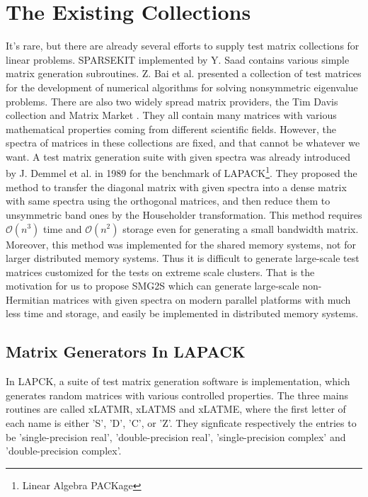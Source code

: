 \section{The Existing Collections} \label{Existing Collections}

It's rare, but there are already several efforts to supply test matrix collections for linear problems. SPARSEKIT \cite{saad1994sparsekit} implemented by Y. Saad contains various simple matrix generation subroutines. Z. Bai et al. \cite{bai1996test} presented a collection of test matrices for the development of numerical algorithms for solving nonsymmetric eigenvalue problems. There are also two widely spread matrix providers, the Tim Davis collection \cite{davis2011university} and Matrix Market \cite{boisvert1997matrix}. They all contain many matrices with various mathematical properties coming from different scientific fields. However, the spectra of matrices in these collections are fixed, and that cannot be whatever we want. A test matrix generation suite with given spectra was already introduced by J. Demmel et al. \cite{demmel1989test} in 1989 for the benchmark of LAPACK\footnote{Linear Algebra PACKage}. They proposed the method to transfer the diagonal matrix with given spectra into a dense matrix with same spectra using the orthogonal matrices, and then reduce them to unsymmetric band ones by the Householder transformation. This method requires $\mathcal{O}(n^3)$ time and $\mathcal{O}(n^2)$ storage even for generating a small bandwidth matrix. Moreover, this method was implemented for the shared memory systems, not for larger distributed memory systems. Thus it is difficult to generate large-scale test matrices customized for the tests on extreme scale clusters. That is the motivation for us to propose SMG2S which can generate large-scale non-Hermitian matrices with given spectra on modern parallel platforms with much less time and storage, and easily be implemented in distributed memory systems.

\iffalse
\subsection{Matrix Generators In LAPACK}

In LAPCK, a suite of test matrix generation software is implementation, which generates random matrices with various controlled properties. The three mains routines are called xLATMR, xLATMS and xLATME, where the first letter of each name is either 'S', 'D', 'C', or 'Z'. They signficate respectively the entries to be 'single-precision real', 'double-precision real', 'single-precision complex' and 'double-precision complex'.

